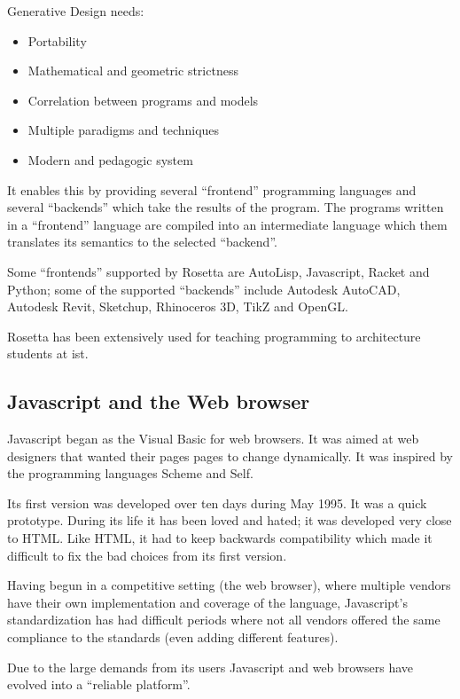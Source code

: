 \documentclass{./llncs2e/llncs}
\begin{document}
	Generative Design needs:
	\begin{itemize}
		\item Portability
		\item Mathematical and geometric strictness
		\item Correlation between programs and models
		\item Multiple paradigms and techniques
		\item Modern and pedagogic system
	\end{itemize}

	It enables this by providing several ``frontend'' programming languages and several ``backends'' which take the results of the program. 
	The programs written in a ``frontend'' language are compiled into an intermediate language which them translates its semantics to the selected ``backend''.

	Some ``frontends'' supported by Rosetta are AutoLisp, Javascript, Racket and Python; some of the supported ``backends'' include Autodesk AutoCAD, Autodesk Revit, Sketchup, Rhinoceros 3D, TikZ and OpenGL.

	Rosetta has been extensively used for teaching programming to architecture students at \ac{ist}. 


\subsection{Javascript and the Web browser}
	Javascript began as the Visual Basic for web browsers.
	It was aimed at web designers that wanted their pages pages to change dynamically. 
	It was inspired by the programming languages Scheme and Self.

	Its first version was developed over ten days during May 1995.
	It was a quick prototype. 
	During its life it has been loved and hated; it was developed very close to HTML.
	Like HTML, it had to keep backwards compatibility which made it difficult to fix the bad choices from its first version.

	Having begun in a competitive setting (the web browser), where multiple vendors have their own implementation and coverage of the language, Javascript's standardization has had difficult periods where not all vendors offered the same compliance to the standards (even adding different features).

	Due to the large demands from its users Javascript and web browsers have evolved into a ``reliable platform''. 
\end{document}
